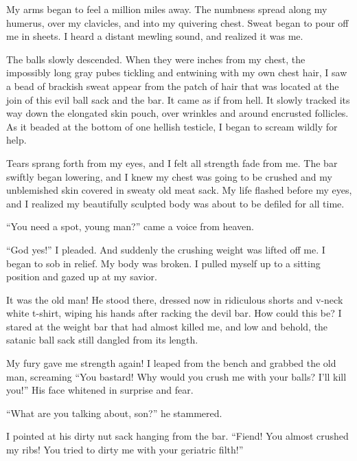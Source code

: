 My arms began to feel a million miles away. The numbness spread
along my humerus, over my clavicles, and into my quivering chest.
Sweat began to pour off me in sheets. I heard a distant mewling
sound, and realized it was me.



The balls slowly descended. When they were inches from my chest,
the impossibly long gray pubes tickling and entwining with my own
chest hair, I saw a bead of brackish sweat appear from the patch of
hair that was located at the join of this evil ball sack and the
bar. It came as if from hell. It slowly tracked its way down the
elongated skin pouch, over wrinkles and around encrusted follicles.
As it beaded at the bottom of one hellish testicle, I began to
scream wildly for help.



Tears sprang forth from my eyes, and I felt all strength fade from
me. The bar swiftly began lowering, and I knew my chest was going
to be crushed and my unblemished skin covered in sweaty old meat
sack. My life flashed before my eyes, and I realized my beautifully
sculpted body was about to be defiled for all time.



``You need a spot, young man?'' came a voice from heaven.



``God yes!'' I pleaded. And suddenly the crushing weight was lifted
off me. I began to sob in relief. My body was broken. I pulled
myself up to a sitting position and gazed up at my savior.



It was the old man! He stood there, dressed now in ridiculous
shorts and v-neck white t-shirt, wiping his hands after racking the
devil bar. How could this be? I stared at the weight bar that had
almost killed me, and low and behold, the satanic ball sack still
dangled from its length.



My fury gave me strength again! I leaped from the bench and grabbed
the old man, screaming ``You bastard! Why would you crush me with
your balls? I'll kill you!'' His face whitened in surprise and
fear.



``What are you talking about, son?'' he stammered.



I pointed at his dirty nut sack hanging from the bar. ``Fiend! You
almost crushed my ribs! You tried to dirty me with your geriatric
filth!''



